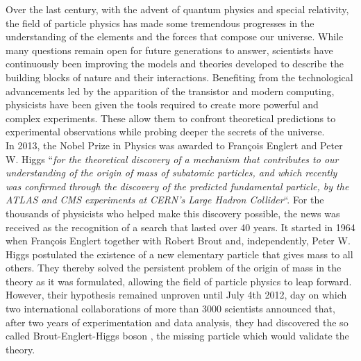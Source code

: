 Over the last century, with the advent of quantum physics and special relativity, the field of particle physics has made some tremendous progresses in the understanding of the elements and the forces that compose our universe. While many questions remain open for future generations to answer, scientists have continuously been improving the models and theories developed to describe the building blocks of nature and their interactions. Benefiting from the technological advancements led by the apparition of the transistor and modern computing, physicists have been given the tools required to create more powerful and complex experiments. These allow them to confront theoretical predictions to experimental observations while probing deeper the secrets of the universe. \\

In 2013, the Nobel Prize in Physics was awarded to Fran\c{c}ois Englert and Peter W. Higgs ``\textit{for the theoretical discovery of a mechanism that contributes to our understanding of the origin of mass of subatomic particles, and which recently was confirmed through the discovery of the predicted fundamental particle, by the ATLAS and CMS experiments at CERN's Large Hadron Collider}``. For the thousands of physicists who helped make this discovery possible, the news was received as the recognition of a search that lasted over 40 years. It started in 1964 when Fran\c{c}ois Englert together with Robert Brout \cite{PhysRevLett.13.321} and, independently, Peter W. Higgs \cite{PhysRevLett.13.508} postulated the existence of a new elementary particle that gives mass to all others. They thereby solved the persistent problem of the origin of mass in the theory as it was formulated, allowing the field of particle physics to leap forward. However, their hypothesis remained unproven until July 4th 2012, day on which two international collaborations of more than 3000 scientists announced that, after two years of experimentation and data analysis, they had discovered the so called Brout-Englert-Higgs boson \cite{PhysRevLett.114.191803}, the missing particle which would validate the theory. \\

